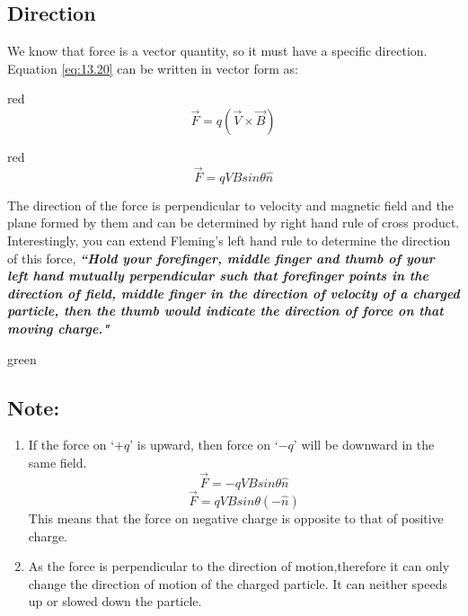 \subsection*{Direction}
We know that force is a vector quantity, so it must have a specific direction. Equation \ref{eq:13.20} can be written in vector form as:
\begin{mybox}{red}{}
\begin{equation}
    \vec{F}=q(\vec{V} \times \vec{B})
\end{equation}
\end{mybox}
\begin{mybox}{red}{}
\begin{equation}
    \vec{F}=qVBsin\theta \hat{n}
\end{equation}
\end{mybox}
The direction of the force is perpendicular to velocity and magnetic field and the plane formed by them and can be determined by right hand rule of cross product. Interestingly, you can extend Fleming’s left hand rule to determine the direction of this force,
\textit{\textbf{``Hold your forefinger, middle finger and thumb of your left hand mutually perpendicular such that forefinger points in the direction of field, middle finger in the direction of velocity of a charged particle, then the thumb would indicate the direction of force on that moving charge."}}
\begin{mybox}{green}{}
\subsection*{\note{}Note:}
\begin{enumerate}[label = (\roman*)]
\item If the force on ‘$+q$’ is upward, then force on ‘$-q$’ will be downward in the same field.
\begin{equation}\nonumber
    \vec{F}=-qVBsin\theta \hat{n}
\end{equation}
\begin{equation}\nonumber
    \vec{F}=qVBsin\theta (-\hat{n})
\end{equation}
This means that the force on negative charge is opposite to that of positive charge.
\item As the force is perpendicular to the direction of motion,therefore it can only change the direction of motion of the charged particle. It can neither speeds up or slowed down the particle.
\end{enumerate}
\end{mybox}
